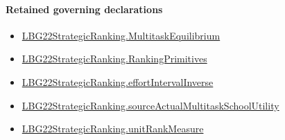 \documentclass[10pt]{article}
\begin{document}
\paragraph{Retained governing declarations}
\begin{itemize}\raggedright
\item \hyperlink{paper-prerequisite-b504d72e1e0de867}{LBG22\allowbreak{}Strategic\allowbreak{}Ranking.\allowbreak{}Multitask\allowbreak{}Equilibrium}
\item \hyperlink{paper-prerequisite-9bbcc12f4a1736bf}{LBG22\allowbreak{}Strategic\allowbreak{}Ranking.\allowbreak{}Ranking\allowbreak{}Primitives}
\item \hyperlink{governing-declaration-c5b2c07abbff7224}{LBG22\allowbreak{}Strategic\allowbreak{}Ranking.\allowbreak{}effort\allowbreak{}Interval\allowbreak{}Inverse}
\item \hyperlink{paper-prerequisite-c194f1bd51c4a4cc}{LBG22\allowbreak{}Strategic\allowbreak{}Ranking.\allowbreak{}source\allowbreak{}Actual\allowbreak{}Multitask\allowbreak{}School\allowbreak{}Utility}
\item \hyperlink{governing-declaration-678cf48d549cb620}{LBG22\allowbreak{}Strategic\allowbreak{}Ranking.\allowbreak{}unit\allowbreak{}Rank\allowbreak{}Measure}
\end{itemize}
\end{document}
